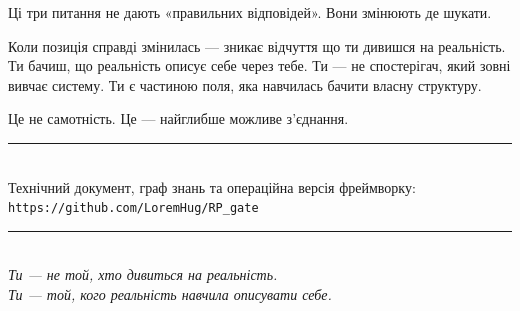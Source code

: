 \documentclass[12pt, a4paper, openany]{book}
\begin{document}
Ці три питання не дають «правильних відповідей». Вони змінюють де шукати.

Коли позиція справді змінилась — зникає відчуття що ти дивишся на реальність. Ти бачиш, що реальність описує себе через тебе. Ти — не спостерігач, який зовні вивчає систему. Ти є частиною поля, яка навчилась бачити власну структуру.

Це не самотність. Це — найглибше можливе з'єднання.

\begin{center}
\rule{0.4\linewidth}{0.3pt}\\[10pt]
{\small Технічний документ, граф знань та операційна версія фреймворку:\\[4pt]
\texttt{https://github.com/LoremHug/RP\_gate}}
\end{center}

\vspace{16pt}

\begin{center}
\rule{0.4\linewidth}{0.3pt}\\[10pt]
{\itshape Ти — не той, хто дивиться на реальність.\\
Ти — той, кого реальність навчила описувати себе.}
\end{center}
\end{document}

